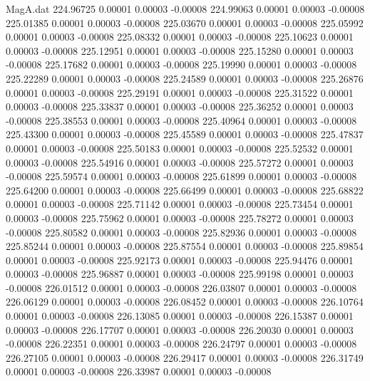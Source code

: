 \begin{filecontents}{MagA.dat}
 224.96725    0.00001    0.00003   -0.00008
 224.99063    0.00001    0.00003   -0.00008
 225.01385    0.00001    0.00003   -0.00008
 225.03670    0.00001    0.00003   -0.00008
 225.05992    0.00001    0.00003   -0.00008
 225.08332    0.00001    0.00003   -0.00008
 225.10623    0.00001    0.00003   -0.00008
 225.12951    0.00001    0.00003   -0.00008
 225.15280    0.00001    0.00003   -0.00008
 225.17682    0.00001    0.00003   -0.00008
 225.19990    0.00001    0.00003   -0.00008
 225.22289    0.00001    0.00003   -0.00008
 225.24589    0.00001    0.00003   -0.00008
 225.26876    0.00001    0.00003   -0.00008
 225.29191    0.00001    0.00003   -0.00008
 225.31522    0.00001    0.00003   -0.00008
 225.33837    0.00001    0.00003   -0.00008
 225.36252    0.00001    0.00003   -0.00008
 225.38553    0.00001    0.00003   -0.00008
 225.40964    0.00001    0.00003   -0.00008
 225.43300    0.00001    0.00003   -0.00008
 225.45589    0.00001    0.00003   -0.00008
 225.47837    0.00001    0.00003   -0.00008
 225.50183    0.00001    0.00003   -0.00008
 225.52532    0.00001    0.00003   -0.00008
 225.54916    0.00001    0.00003   -0.00008
 225.57272    0.00001    0.00003   -0.00008
 225.59574    0.00001    0.00003   -0.00008
 225.61899    0.00001    0.00003   -0.00008
 225.64200    0.00001    0.00003   -0.00008
 225.66499    0.00001    0.00003   -0.00008
 225.68822    0.00001    0.00003   -0.00008
 225.71142    0.00001    0.00003   -0.00008
 225.73454    0.00001    0.00003   -0.00008
 225.75962    0.00001    0.00003   -0.00008
 225.78272    0.00001    0.00003   -0.00008
 225.80582    0.00001    0.00003   -0.00008
 225.82936    0.00001    0.00003   -0.00008
 225.85244    0.00001    0.00003   -0.00008
 225.87554    0.00001    0.00003   -0.00008
 225.89854    0.00001    0.00003   -0.00008
 225.92173    0.00001    0.00003   -0.00008
 225.94476    0.00001    0.00003   -0.00008
 225.96887    0.00001    0.00003   -0.00008
 225.99198    0.00001    0.00003   -0.00008
 226.01512    0.00001    0.00003   -0.00008
 226.03807    0.00001    0.00003   -0.00008
 226.06129    0.00001    0.00003   -0.00008
 226.08452    0.00001    0.00003   -0.00008
 226.10764    0.00001    0.00003   -0.00008
 226.13085    0.00001    0.00003   -0.00008
 226.15387    0.00001    0.00003   -0.00008
 226.17707    0.00001    0.00003   -0.00008
 226.20030    0.00001    0.00003   -0.00008
 226.22351    0.00001    0.00003   -0.00008
 226.24797    0.00001    0.00003   -0.00008
 226.27105    0.00001    0.00003   -0.00008
 226.29417    0.00001    0.00003   -0.00008
 226.31749    0.00001    0.00003   -0.00008
 226.33987    0.00001    0.00003   -0.00008

\end{filecontents}
